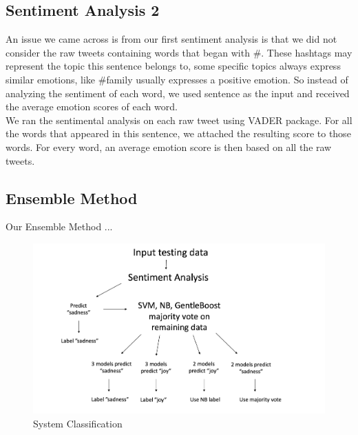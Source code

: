 \documentclass[]{article}
\begin{document}
\subsection{Sentiment Analysis 2}

An issue we came across is from our first sentiment analysis is that we did not consider the raw tweets containing words that began with \#. These hashtags may represent the topic this sentence belongs to, some specific topics always express similar emotions, like \#family usually expresses a positive emotion. So instead of analyzing the sentiment of each word, we used sentence as the input and received the average emotion scores of each word.\\

We ran the sentimental analysis on each raw tweet using VADER package. For all the words that appeared in this sentence, we attached the resulting score to those words. For every word, an average emotion score is then based on all the raw tweets. \\ 

\subsection{Ensemble Method}

Our Ensemble Method ... 

\begin{figure}
	\centering
  \includegraphics[scale=0.4]{Method.jpg}
  \caption{System Classification}
  \label{fig:System Classification}
\end{figure}
\end{document}

